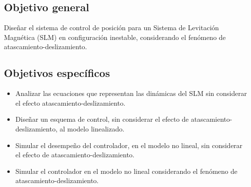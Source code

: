 \subsection{Objetivo general}
Diseñar el sistema de control de posición para un Sistema de Levitación Magnética (SLM) en configuración inestable, considerando el fenómeno de atascamiento-deslizamiento.

\subsection{Objetivos específicos}
\begin{itemize}
\item Analizar las ecuaciones que representan las dinámicas del SLM sin considerar el efecto atascamiento-deslizamiento. 
\item Diseñar un esquema de control, sin considerar el efecto de atascamiento-deslizamiento, al modelo linealizado.
\item Simular el desempeño del controlador, en el modelo no lineal, sin considerar el efecto de atascamiento-deslizamiento.
\item Simular el controlador en el modelo no lineal considerando el fenómeno de atascamiento-deslizamiento.
\end{itemize}

